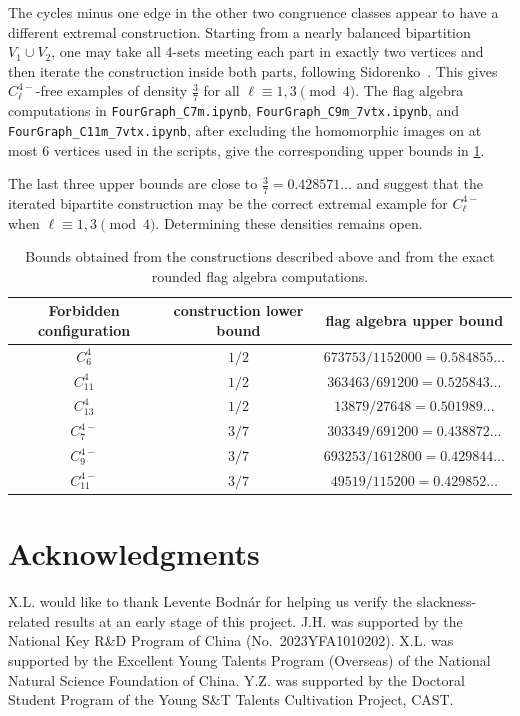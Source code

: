 \documentclass[10pt,a4paper]{article}
\theoremstyle{plain}
\theoremstyle{definition}
\begin{document}
The cycles minus one edge in the other two congruence classes appear to have a different extremal construction.
Starting from a nearly balanced bipartition $V_1\cup V_2$, one may take all $4$-sets meeting each part in exactly two vertices and then iterate the construction inside both parts, following Sidorenko~\cite{Sid24}.
This gives $C_{\ell}^{4-}$-free examples of density $\frac37$ for all $\ell\equiv1,3\pmod4$.
The flag algebra computations in \texttt{FourGraph\_C7m.ipynb}, \texttt{FourGraph\_C9m\_7vtx.ipynb}, and \texttt{FourGraph\_C11m\_7vtx.ipynb}, after excluding the homomorphic images on at most $6$ vertices used in the scripts, give the corresponding upper bounds in \cref{TAB:remarks-bounds}.

The last three upper bounds are close to $\frac37=0.428571\ldots$ and suggest that the iterated bipartite construction may be the correct extremal example for $C_{\ell}^{4-}$ when $\ell\equiv1,3\pmod4$.
Determining these densities remains open.


\begin{table}[H]
\centering
\begingroup
\renewcommand{\arraystretch}{1.2}
\begin{tabular}{ccc}
\toprule
Forbidden configuration & construction lower bound & flag algebra upper bound \\
\midrule
$C_6^4$ & $1/2$ & $673753/1152000=0.584855\ldots$ \\
$C_{11}^4$ & $1/2$ & $363463/691200=0.525843\ldots$ \\
$C_{13}^4$ & $1/2$ & $13879/27648=0.501989\ldots$ \\
$C_{7}^{4-}$ & $3/7$ & $303349/691200=0.438872\ldots$ \\
$C_{9}^{4-}$ & $3/7$ & $693253/1612800=0.429844\ldots$ \\
$C_{11}^{4-}$ & $3/7$ & $49519/115200=0.429852\ldots$ \\
\bottomrule
\end{tabular}
\endgroup
\caption{Bounds obtained from the constructions described above and from the exact rounded flag algebra computations.}
\label{TAB:remarks-bounds}
\end{table}

\section*{Acknowledgments}
%
\begin{sloppypar}
X.L. would like to thank Levente Bodn\'ar for helping us verify the slackness-related results at an early stage of this project. 
J.H. was supported by the National Key R\&D Program of China (No.~2023YFA1010202). 
X.L. was supported by the Excellent Young Talents Program (Overseas) of the National Natural Science Foundation of China. 
Y.Z. was supported by the Doctoral Student Program of the Young S\&T Talents Cultivation Project, CAST. 
\end{sloppypar}


\end{document}
